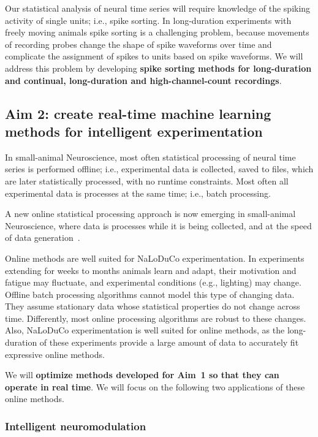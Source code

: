 \documentclass[12pt]{article}
\begin{document}
Our statistical analysis of neural time series will require knowledge of the
spiking activity of single units; i.e., spike sorting. In long-duration
experiments with freely moving animals spike sorting is a challenging problem,
because movements of recording probes change the shape of spike waveforms over
time and complicate the assignment of spikes to units based on spike waveforms.
We will address this problem by developing \textbf{spike sorting methods for
long-duration and continual, long-duration and high-channel-count recordings}.

\subsection{Aim 2: create real-time machine learning methods for intelligent
experimentation}

In small-animal Neuroscience, most often statistical processing of neural time series is
performed offline;
i.e., experimental data is collected, saved to files, which are later
statistically processed, with no runtime constraints. Most often all
experimental data is processes at the same time; i.e., batch processing.

A new online statistical processing approach is now emerging in small-animal Neuroscience,
where data is processes while it is being collected, and at the speed of data
generation~\citep{vermaniEtAl24}.

Online methods are well suited for NaLoDuCo experimentation. In experiments
extending for weeks to months animals learn and adapt, their motivation and
fatigue may fluctuate, and experimental conditions (e.g., lighting) may change.
Offline batch processing algorithms cannot model this type of changing data.
They assume stationary data whose statistical properties do not change across
time. Differently, most online processing algorithms are robust to
these changes.
%
Also, NaLoDuCo experimentation is well suited for online methods, as the
long-duration of these experiments provide a large amount of data to accurately
fit expressive online methods.

We will \textbf{optimize methods developed for Aim~1 so that they can operate
in real time}. We will focus on the following two applications of these online
methods.

\subsubsection*{Intelligent neuromodulation}
\end{document}
